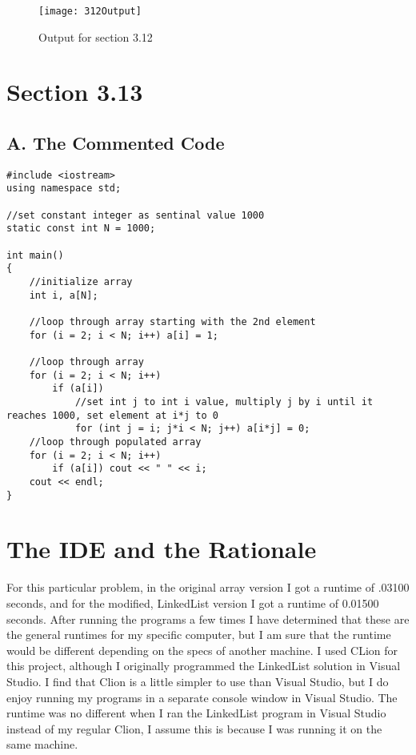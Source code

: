 \documentclass[11pt]{article}
\begin{document}
\begin{figure}[h]
    \centering
    \texttt{[image: 312Output]}
    \caption{Output for section 3.12}
    \label{fig:my_label}
\end{figure}

\section*{Section 3.13}
\subsection*{A. The Commented Code}
\begin{lstlisting}
#include <iostream>
using namespace std;

//set constant integer as sentinal value 1000
static const int N = 1000;

int main()
{
    //initialize array
    int i, a[N];
    
    //loop through array starting with the 2nd element
    for (i = 2; i < N; i++) a[i] = 1;
    
    //loop through array
    for (i = 2; i < N; i++)
        if (a[i])
            //set int j to int i value, multiply j by i until it reaches 1000, set element at i*j to 0
            for (int j = i; j*i < N; j++) a[i*j] = 0;
    //loop through populated array
    for (i = 2; i < N; i++)
        if (a[i]) cout << " " << i;
    cout << endl;
}
\end{lstlisting}

\section*{The IDE and the Rationale}
For this particular problem, in the original array version I got a runtime of .03100 seconds, and for the modified, LinkedList version I got a runtime of 0.01500 seconds. After running the programs a few times I have determined that these are the general runtimes for my specific computer, but I am sure that the runtime would be different depending on the specs of another machine. 
\newline \newline
I used CLion for this project, although I originally programmed the LinkedList solution in Visual Studio. I find that Clion is a little simpler to use than Visual Studio, but I do enjoy running my programs in a separate console window in Visual Studio. The runtime was no different when I ran the LinkedList program in Visual Studio instead of my regular Clion, I assume this is because I was running it on the same machine. 
\end{document}
